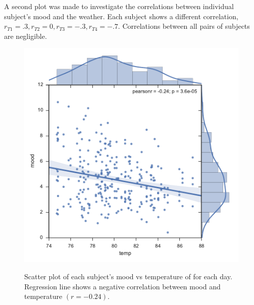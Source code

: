 \documentclass[onecolumn,10pt]{jhwhw}
\begin{document}
A second plot was made to investigate the correlations between individual subject's mood and the weather. Each subject shows a different correlation, $r_{T1} = .3, r_{T2} = 0, r_{T3} = -.3, r_{T4} = -.7$. Correlations between all pairs of subjects are negligible.
\begin{figure}[h!]
\begin{center}
\includegraphics[height=0.5\textheight]{p1-mean.pdf}
\label{fig:on}
\end{center}
\caption{Scatter plot of each subject's mood vs temperature of for each day. Regression line shows a negative correlation between mood and temperature $(r=-0.24)$. }
\end{figure}
\end{document}
